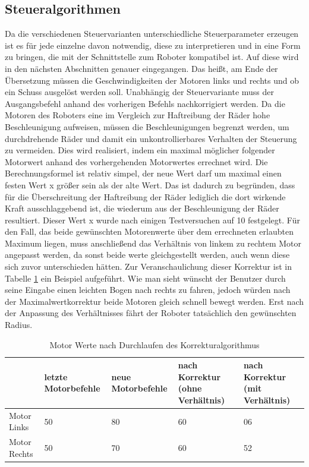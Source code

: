 \subsection{Steueralgorithmen}
Da die verschiedenen Steuervarianten unterschiedliche Steuerparameter erzeugen ist es für jede einzelne davon notwendig, diese zu interpretieren und in eine Form zu bringen, die mit der Schnittstelle zum Roboter kompatibel ist. Auf diese wird in den nächsten Abschnitten genauer eingegangen. Das heißt, am Ende der Übersetzung müssen die Geschwindigkeiten der Motoren links und rechts und ob ein Schuss ausgelöst werden soll. Unabhängig der Steuervariante muss der Ausgangsbefehl anhand des vorherigen Befehls nachkorrigiert werden. Da die Motoren des Roboters eine im Vergleich zur Haftreibung der Räder hohe Beschleunigung aufweisen, müssen die Beschleunigungen begrenzt werden, um durchdrehende Räder und damit ein unkontrollierbares Verhalten der Steuerung zu vermeiden. 
Dies wird realisiert, indem ein maximal möglicher folgender Motorwert anhand des vorhergehenden Motorwertes errechnet wird. Die Berechnungsformel ist relativ simpel, der neue Wert darf um maximal einen festen Wert x größer sein als der alte Wert. Das ist dadurch zu begründen, dass für die Überschreitung der Haftreibung der Räder lediglich die dort wirkende Kraft ausschlaggebend ist, die wiederum aus der Beschleunigung der Räder resultiert. Dieser Wert x wurde nach einigen Testversuchen auf 10 festgelegt. Für den Fall, das beide gewünschten Motorenwerte über dem errechneten erlaubten Maximum liegen, muss anschließend das Verhältnis von linkem zu rechtem Motor angepasst werden, da sonst beide werte gleichgestellt werden, auch wenn diese sich zuvor unterschieden hätten. 
Zur Veranschaulichung dieser Korrektur ist in Tabelle \ref{tab:bsp_korrektur} ein Beispiel aufgeführt. Wie man sieht wünscht der Benutzer durch seine Eingabe einen leichten Bogen nach rechts zu fahren, jedoch würden nach der Maximalwertkorrektur beide Motoren gleich schnell bewegt werden. Erst nach der Anpassung des Verhältnisses fährt der Roboter tatsächlich den gewünschten Radius.

\vspace{1cm}

\begin{table}[h!]
	\begin{tabularx}{\textwidth}{|X|X|X|X|X|}
		\hline
		 & letzte Motorbefehle & neue Motorbefehle & nach Korrektur (ohne Verhältnis) & nach Korrektur (mit Verhältnis) \\ \hline
		Motor Links      & 50      & 80      & 60      &
		06  \\
		Motor Rechts      & 50      & 70      & 60
		& 52 \\ \hline
	\end{tabularx}
	\caption{Motor Werte nach Durchlaufen des Korrekturalgorithmus}
	\label{tab:bsp_korrektur}
\end{table}



